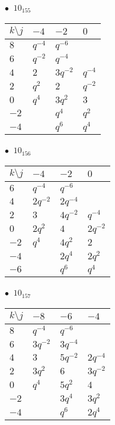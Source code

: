 %
\begin{minipage}{\linewidth}
$\bullet\ $ $10_{155}$ \vspace{0.5em} \\
\begin{tabular}{l|lll}
$k \setminus j$ & $-4$ & $-2$ & $0$ \\
\hline
$8$ & $q^{-4}$ & $q^{-6}$ &  \\
$6$ & $q^{-2}$ & $q^{-4}$ &  \\
$4$ & $2$ & $3q^{-2}$ & $q^{-4}$ \\
$2$ & $q^{2}$ & $2$ & $q^{-2}$ \\
$0$ & $q^{4}$ & $3q^{2}$ & $3$ \\
$-2$ &  & $q^{4}$ & $q^{2}$ \\
$-4$ &  & $q^{6}$ & $q^{4}$ \\
\end{tabular}
\vspace{2em}
\end{minipage}
%
\begin{minipage}{\linewidth}
$\bullet\ $ $10_{156}$ \vspace{0.5em} \\
\begin{tabular}{l|lll}
$k \setminus j$ & $-4$ & $-2$ & $0$ \\
\hline
$6$ & $q^{-4}$ & $q^{-6}$ &  \\
$4$ & $2q^{-2}$ & $2q^{-4}$ &  \\
$2$ & $3$ & $4q^{-2}$ & $q^{-4}$ \\
$0$ & $2q^{2}$ & $4$ & $2q^{-2}$ \\
$-2$ & $q^{4}$ & $4q^{2}$ & $2$ \\
$-4$ &  & $2q^{4}$ & $2q^{2}$ \\
$-6$ &  & $q^{6}$ & $q^{4}$ \\
\end{tabular}
\vspace{2em}
\end{minipage}
%
\begin{minipage}{\linewidth}
$\bullet\ $ $10_{157}$ \vspace{0.5em} \\
\begin{tabular}{l|lll}
$k \setminus j$ & $-8$ & $-6$ & $-4$ \\
\hline
$8$ & $q^{-4}$ & $q^{-6}$ &  \\
$6$ & $3q^{-2}$ & $3q^{-4}$ &  \\
$4$ & $3$ & $5q^{-2}$ & $2q^{-4}$ \\
$2$ & $3q^{2}$ & $6$ & $3q^{-2}$ \\
$0$ & $q^{4}$ & $5q^{2}$ & $4$ \\
$-2$ &  & $3q^{4}$ & $3q^{2}$ \\
$-4$ &  & $q^{6}$ & $2q^{4}$ \\
\end{tabular}
\vspace{2em}
\end{minipage}
